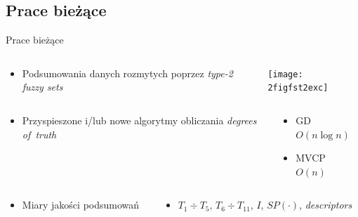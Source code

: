 \documentclass{beamer}
\begin{document}
\subsection{Prace bieżące}
\begin{frame}{Prace bieżące}%
 \begin{columns}
  \begin{column}{0.64\textwidth}
	\begin{itemize}
		\item <1->Podsumowania danych \alert<1>{rozmytych} poprzez {\em type-2 fuzzy sets}
	\end{itemize}
 \end{column}
 \begin{column}{0.36\textwidth}
\texttt{[image: 2figfst2exc]}
		\vspace{-2mm}
 \end{column}
\end{columns}

\begin{columns}
\begin{column}{0.64\textwidth}
	\begin{itemize}
		\item <2->Przyspieszone i/lub nowe algorytmy obliczania
\alert<2>{\em degrees of~truth}
	\end{itemize}
\end{column}
\begin{column}{0.36\textwidth}
   	\begin{itemize}
		\item <2>GD $O(n \log n)$
		\item <2>MVCP $O(n)$
	\end{itemize}
\end{column}
\end{columns}

\begin{columns}
\begin{column}{0.64\textwidth}
	\begin{itemize}
		\item <3->\alert<3>{Miary jakości} podsumowań
	\end{itemize}
\end{column}
\begin{column}{0.36\textwidth}
	\begin{itemize}
		\item<3> $T_1\div T_5$, $T_6\div T_{11}$, $I$, $SP(\cdot)$,
		{\em descriptors}
	\end{itemize}
\end{column}
\end{columns}


\end{frame}
\end{document}
